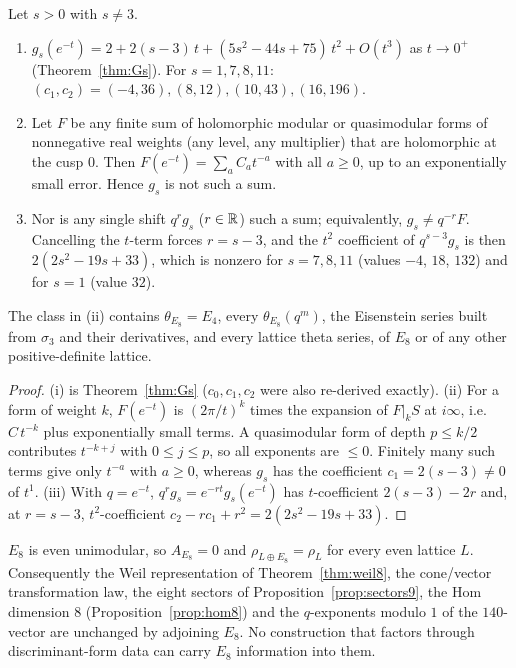\begin{proposition}\label{prop:N1}
Let $s>0$ with $s\neq3$.
\begin{enumerate}[label=(\roman*)]
\item $g_s(e^{-t})=2+2(s-3)\,t+(5s^2-44s+75)\,t^2+O(t^3)$ as $t\to0^+$ (Theorem~\ref{thm:Gs}). For $s=1,7,8,11$: $(c_1,c_2)=(-4,36),(8,12),(10,43),(16,196)$.
\item Let $F$ be any finite sum of holomorphic modular or quasimodular forms of nonnegative real weights (any level, any multiplier) that are holomorphic at the cusp $0$. Then $F(e^{-t})=\sum_aC_at^{-a}$ with all $a\ge0$, up to an exponentially small error. Hence $g_s$ is not such a sum.
\item Nor is any single shift $q^rg_s$ ($r\in\mathbb{R}$) such a sum; equivalently, $g_s\neq q^{-r}F$. Cancelling the $t$-term forces $r=s-3$, and the $t^2$ coefficient of $q^{s-3}g_s$ is then $2(2s^2-19s+33)$, which is nonzero for $s=7,8,11$ (values $-4$, $18$, $132$) and for $s=1$ (value $32$).
\end{enumerate}
The class in (ii) contains $\theta_{E_8}=E_4$, every $\theta_{E_8}(q^m)$, the Eisenstein series built from $\sigma_3$ and their derivatives, and every lattice theta series, of $E_8$ or of any other positive-definite lattice.
\end{proposition}
\begin{proof}
(i) is Theorem~\ref{thm:Gs} ($c_0,c_1,c_2$ were also re-derived exactly). (ii) For a form of weight $k$, $F(e^{-t})$ is $(2\pi/t)^k$ times the expansion of $F|_kS$ at $i\infty$, i.e.\ $C\,t^{-k}$ plus exponentially small terms. A quasimodular form of depth $p\le k/2$ contributes $t^{-k+j}$ with $0\le j\le p$, so all exponents are $\le0$. Finitely many such terms give only $t^{-a}$ with $a\ge0$, whereas $g_s$ has the coefficient $c_1=2(s-3)\neq0$ of $t^{1}$. (iii) With $q=e^{-t}$, $q^rg_s=e^{-rt}g_s(e^{-t})$ has $t$-coefficient $2(s-3)-2r$ and, at $r=s-3$, $t^2$-coefficient $c_2-rc_1+r^2=2(2s^2-19s+33)$.
\end{proof}
\begin{proposition}\label{prop:N2}
$E_8$ is even unimodular, so $A_{E_8}=0$ and $\rho_{L\oplus E_8}=\rho_L$ for every even lattice $L$. Consequently the Weil representation of Theorem~\ref{thm:weil8}, the cone/vector transformation law, the eight sectors of Proposition~\ref{prop:sectors9}, the Hom dimension $8$ (Proposition~\ref{prop:hom8}) and the $q$-exponents modulo $1$ of the $140$-vector are unchanged by adjoining $E_8$. No construction that factors through discriminant-form data can carry $E_8$ information into them.
\end{proposition}
